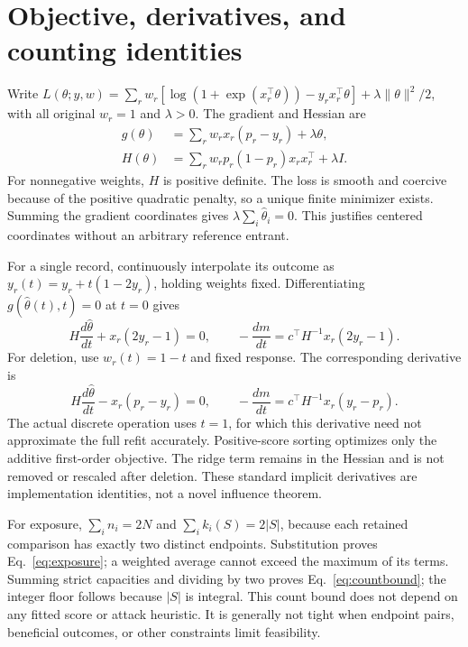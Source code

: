 \section{Objective, derivatives, and counting identities}\label{app:derivation}
Write $L(\theta;y,w)=\sum_r w_r[\log(1+\exp(x_r^\top\theta))-y_rx_r^\top\theta]+\lambda\|\theta\|^2/2$, with all original $w_r=1$ and $\lambda>0$. The gradient and Hessian are
\begin{align}\label{eq:grad}
 g(\theta)&=\sum_r w_rx_r(p_r-y_r)+\lambda\theta,\\
 H(\theta)&=\sum_r w_rp_r(1-p_r)x_rx_r^\top+\lambda I.\label{eq:hessian}
\end{align}
For nonnegative weights, $H$ is positive definite. The loss is smooth and coercive because of the positive quadratic penalty, so a unique finite minimizer exists. Summing the gradient coordinates gives $\lambda\sum_i\widehat\theta_i=0$. This justifies centered coordinates without an arbitrary reference entrant.

For a single record, continuously interpolate its outcome as $y_r(t)=y_r+t(1-2y_r)$, holding weights fixed. Differentiating $g(\widehat\theta(t),t)=0$ at $t=0$ gives
\begin{equation}\label{eq:flipderivative}
 H\frac{d\widehat\theta}{dt}+x_r(2y_r-1)=0,
 \qquad -\frac{dm}{dt}=c^\top H^{-1}x_r(2y_r-1).
\end{equation}
For deletion, use $w_r(t)=1-t$ and fixed response. The corresponding derivative is
\begin{equation}\label{eq:delderivative}
 H\frac{d\widehat\theta}{dt}-x_r(p_r-y_r)=0,
 \qquad -\frac{dm}{dt}=c^\top H^{-1}x_r(y_r-p_r).
\end{equation}
The actual discrete operation uses $t=1$, for which this derivative need not approximate the full refit accurately. Positive-score sorting optimizes only the additive first-order objective. The ridge term remains in the Hessian and is not removed or rescaled after deletion. These standard implicit derivatives are implementation identities, not a novel influence theorem.

For exposure, $\sum_i n_i=2N$ and $\sum_i k_i(S)=2|S|$, because each retained comparison has exactly two distinct endpoints. Substitution proves Eq.~\eqref{eq:exposure}; a weighted average cannot exceed the maximum of its terms. Summing strict capacities and dividing by two proves Eq.~\eqref{eq:countbound}; the integer floor follows because $|S|$ is integral. This count bound does not depend on any fitted score or attack heuristic. It is generally not tight when endpoint pairs, beneficial outcomes, or other constraints limit feasibility.

